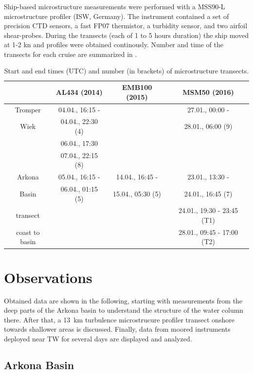 Ship-based microstructure measurements were performed with a MSS90-L 
microstructure profiler (ISW, Germany). The instrument contained a set of 
precision CTD sensors, a fast FP07 thermistor, a turbidity sensor, and two 
airfoil shear-probes. During the transects (each of 1 to 5 hours duration) the 
ship moved at 1-2 kn and profiles were obtained continously. Number and time of 
the transects for each cruise are summarized in .

 \begin{table}
\caption{Start and end times (UTC) and number (in brackets) of microstructure 
transects.}\label{mss}
\begin{center}
\begin{tabular}{cccc}
 & AL434 (2014) & EMB100 (2015) & MSM50 (2016)\\
 \hline
Tromper & 04.04., 16:15 - & & 27.01., 00:00 - \\ 
Wiek & 04.04., 22:30 (4) & & 28.01., 06:00 (9)\\
 & 06.04., 17:30 & & \\
 &  07.04., 22:15 (8) & & \\
\hline
Arkona & 05.04., 16:15 - & 14.04., 16:45 - & 23.01., 13:30 - \\
Basin & 06.04., 01:15 (5) & 15.04., 05:30 (5) & 24.01., 16:45 (7)\\
\hline
transect &  & & 24.01., 19:30 - 23:45 (T1)\\
coast to basin & & & 28.01., 09:45 - 17:00 (T2)\\
\end{tabular}
\end{center}
\end{table}

\section{Observations}

Obtained data are shown in the following, starting with measurements from the 
deep parts of the Arkona basin to understand the structure of the water 
column there. After that, a 13~km turbulence microstrucure profiler transect 
onshore towards shallower areas is discussed. Finally, data from moored 
instruments deployed near TW for several days are displayed and analyzed.

\subsection{Arkona Basin}

